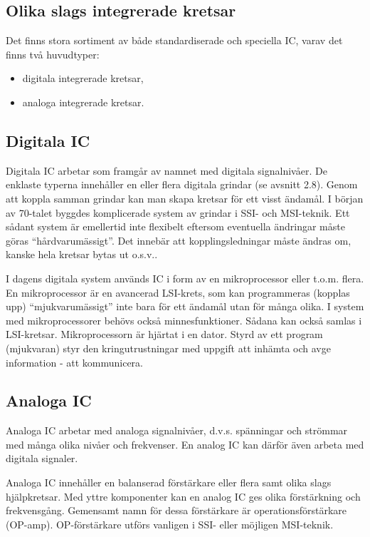 \subsection{Olika slags integrerade kretsar}

Det finns stora sortiment av både standardiserade och speciella IC, varav det
finns två huvudtyper:
\begin{itemize}
\item digitala integrerade kretsar,
\item analoga integrerade kretsar.
\end{itemize}

\subsection{Digitala IC}

Digitala IC arbetar som framgår av namnet med digitala signalnivåer. De enklaste
typerna innehåller en eller flera digitala grindar (se avsnitt 2.8). Genom att
koppla samman grindar kan man skapa kretsar för ett visst ändamål. I början av
70-talet byggdes komplicerade system av grindar i SSI- och MSI-teknik. Ett
sådant system är emellertid inte flexibelt eftersom eventuella ändringar måste
göras ``hårdvarumässigt''. Det innebär att kopplingsledningar måste ändras om,
kanske hela kretsar bytas ut o.s.v..

I dagens digitala system används IC i form av en mikroprocessor eller t.o.m.
flera. En mikroprocessor är en avancerad LSI-krets, som kan programmeras
(kopplas upp) ``mjukvarumässigt'' inte bara för ett ändamål utan för många
olika. I system med mikroprocessorer behövs också minnesfunktioner. Sådana kan
också samlas i LSI-kretsar. Mikroprocessorn är hjärtat i en dator. Styrd av ett
program (mjukvaran) styr den kringutrustningar med uppgift att inhämta och avge
information - att kommunicera.

\subsection{Analoga IC}

Analoga IC arbetar med analoga signalnivåer, d.v.s. spänningar och strömmar med
många olika nivåer och frekvenser. En analog IC kan därför även arbeta med
digitala signaler.

Analoga IC innehåller en balanserad förstärkare eller flera samt olika slags
hjälpkretsar. Med yttre komponenter kan en analog IC ges olika förstärkning och
frekvensgång. Gemensamt namn för dessa förstärkare är operationsförstärkare
(OP-amp). OP-förstärkare utförs vanligen i SSI- eller möjligen MSI-teknik.

